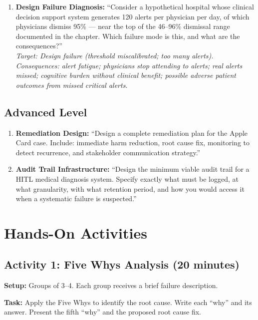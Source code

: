 \begin{enumerate}
    \item \textbf{Design Failure Diagnosis:} ``Consider a hypothetical hospital whose clinical decision support system generates 120 alerts per physician per day, of which physicians dismiss 95\% --- near the top of the 46--96\% dismissal range documented in the chapter. Which failure mode is this, and what are the consequences?''\\
    \textit{Target: Design failure (threshold miscalibrated; too many alerts). Consequences: alert fatigue; physicians stop attending to alerts; real alerts missed; cognitive burden without clinical benefit; possible adverse patient outcomes from missed critical alerts.}
\end{enumerate}

\subsection{Advanced Level}

\begin{enumerate}
    \item \textbf{Remediation Design:} ``Design a complete remediation plan for the Apple Card case. Include: immediate harm reduction, root cause fix, monitoring to detect recurrence, and stakeholder communication strategy.''

    \item \textbf{Audit Trail Infrastructure:} ``Design the minimum viable audit trail for a HITL medical diagnosis system. Specify exactly what must be logged, at what granularity, with what retention period, and how you would access it when a systematic failure is suspected.''
\end{enumerate}

\section{Hands-On Activities}

\subsection{Activity 1: Five Whys Analysis (20 minutes)}

\textbf{Setup:} Groups of 3--4. Each group receives a brief failure description.

\textbf{Task:} Apply the Five Whys to identify the root cause. Write each ``why'' and its answer. Present the fifth ``why'' and the proposed root cause fix.

